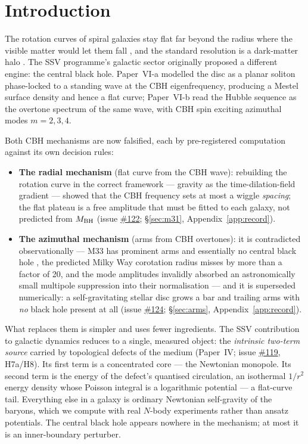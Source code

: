 \documentclass[11pt,a4paper]{article}
\providecommand{\ssvissue}[1]{\hyperref[issue:#1]{\##1}}
\begin{document}
\section{Introduction}
\label{sec:intro}

The rotation curves of spiral galaxies stay flat far beyond the radius
where the visible matter would let them fall \cite{rubin1980}, and the
standard resolution is a dark-matter halo \cite{nfw1997}.  The SSV
programme's galactic sector originally proposed a different engine: the
central black hole.  Paper~VI-a modelled the disc as a planar soliton
phase-locked to a standing wave at the CBH eigenfrequency, producing a
Mestel surface density \cite{mestel1963} and hence a flat curve;
Paper~VI-b read the Hubble sequence as the overtone spectrum of the same
wave, with CBH spin exciting azimuthal modes $m = 2, 3, 4$.

Both CBH mechanisms are now falsified, each by pre-registered
computation against its own decision rules:

\begin{itemize}
  \item \textbf{The radial mechanism} (flat curve from the CBH wave):
    rebuilding the rotation curve in the correct framework --- gravity as
    the time-dilation-field gradient --- showed that the CBH frequency
    sets at most a wiggle \emph{spacing}; the flat plateau is a free
    amplitude that must be fitted to each galaxy, not predicted from
    $M_{\rm BH}$ (issue \ssvissue{122};
    \S\ref{sec:m31}, Appendix~\ref{app:record}).
  \item \textbf{The azimuthal mechanism} (arms from CBH overtones): it is
    contradicted observationally --- M33 has prominent arms and
    essentially no central black hole \cite{gebhardt2001}, the predicted
    Milky Way corotation radius misses by more than a factor of 20, and
    the mode amplitudes invalidly absorbed an astronomically small
    multipole suppression into their normalisation --- and it is
    superseded numerically: a self-gravitating stellar disc grows a bar
    and trailing arms with \emph{no} black hole present at all
    (issue \ssvissue{124}; \S\ref{sec:arms},
    Appendix~\ref{app:record}).
\end{itemize}

What replaces them is simpler and uses fewer ingredients.  The SSV
contribution to galactic dynamics reduces to a single, measured object:
the \emph{intrinsic two-term source} carried by topological defects of
the medium (Paper~IV; issue \ssvissue{119}, H7a/H8).  Its first term is a
concentrated core --- the Newtonian monopole.  Its second term is the
energy of the defect's quantised circulation, an isothermal $1/r^2$
energy density whose Poisson integral is a logarithmic potential --- a
flat-curve tail.  Everything else in a galaxy is ordinary Newtonian
self-gravity of the baryons, which we compute with real $N$-body
experiments rather than ansatz potentials.  The central black hole
appears nowhere in the mechanism; at most it is an inner-boundary
perturber.
\end{document}
